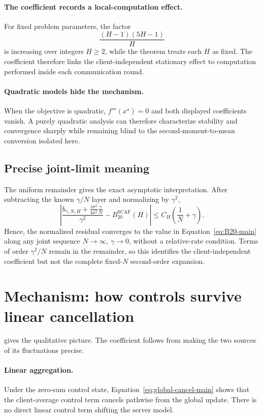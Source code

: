 \documentclass[11pt]{article}
\theoremstyle{definition}
\newcommand{\bstat}{b_{\gamma,N,H}}
\begin{document}
\paragraph{The coefficient records a local-computation effect.}
For fixed problem parameters, the factor
\[
\frac{(H-1)(5H-1)}{H}
\]
is increasing over integers $H\ge2$, while the theorem treats each $H$ as fixed. The coefficient therefore links the client-independent stationary effect to computation performed inside each communication round.

\paragraph{Quadratic models hide the mechanism.}
When the objective is quadratic, $f'''(x^\star)=0$ and both displayed coefficients vanish. A purely quadratic analysis can therefore characterize stability and convergence sharply while remaining blind to the second-moment-to-mean conversion isolated here.

\subsection{Precise joint-limit meaning}
The uniform remainder gives the exact asymptotic interpretation. After subtracting the known $\gamma/N$ layer and normalizing by $\gamma^2$,
\begin{equation}
\label{eq:normalized-remainder}
\left|
\frac{\bstat+\frac{\tau\sigma^2}{4a^2}\frac{\gamma}{N}}{\gamma^2}
-B_{20}^{\mathrm{SCAF}}(H)
\right|
\le C_H\left(\frac1N+\gamma\right).
\end{equation}
Hence, the normalized residual converges to the value in Equation~\eqref{eq:B20-main} along any joint sequence $N\to\infty$, $\gamma\to0$, without a relative-rate condition. Terms of order $\gamma^2/N$ remain in the remainder, so this identifies the client-independent coefficient but not the complete fixed-$N$ second-order expansion.

\section{Mechanism: how controls survive linear cancellation}
\label{sec:mechanism}

 gives the qualitative picture. The coefficient follows from making the two sources of its fluctuations precise.

\paragraph{Linear aggregation.}
Under the zero-sum control state, Equation~\eqref{eq:global-cancel-main} shows that the client-average control term cancels pathwise from the global update. There is no direct linear control term shifting the server model.
\end{document}
